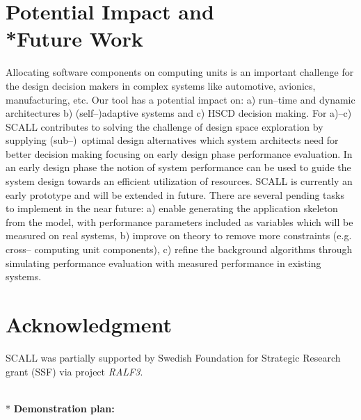 \documentclass{sig-alternate}
\begin{document}
\section{Potential Impact and \\*Future Work}
Allocating software components on computing units is an important challenge for the design decision makers in complex systems like automotive, avionics, manufacturing, etc. 
Our tool has a potential impact on: a) run--time and dynamic architectures b) (self--)adaptive systems and c) HSCD decision making. For a)--c) SCALL contributes to solving the challenge of design space exploration by supplying (sub--)~optimal design alternatives which system architects need for better decision making focusing on early design phase performance evaluation. In an early design phase the notion of system performance can be used to guide the system design towards an efficient utilization of resources. SCALL is currently an early prototype and will be extended in future. There are several pending tasks to implement in the near future: a) enable generating the application skeleton from the model, with performance parameters included as variables which will be measured on real systems, b) improve on theory to remove more constraints (e.g. cross-- computing unit components), c) refine the background algorithms through simulating performance evaluation with measured performance in existing systems. 


\section*{Acknowledgment}

SCALL was partially supported by Swedish Foundation for Strategic Research grant (SSF) via project \textit{RALF3}. 
\vfill

%

%
%

\clearpage
\onecolumn

\appendix
\hfill
\\*
\textbf{Demonstration plan:}
\end{document}
